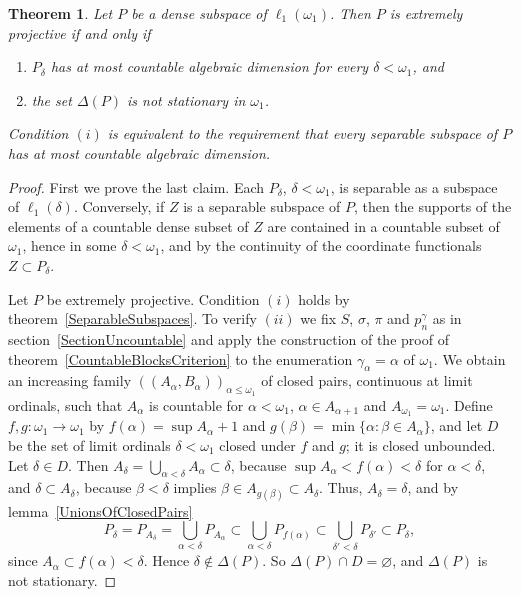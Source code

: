 \documentclass[12pt]{article}
\newtheorem{theorem}{Theorem}[section]
\newcommand{\ellone}[1]{\ell_1(#1)}
\begin{document}
\begin{theorem}\label{AlephOneCriterion} Let $P$ be a dense subspace of
    $\ellone{\omega_1}$. Then $P$ is extremely projective if and only if
    \begin{enumerate}[label = (\roman*)]
        \item $P_\delta$ has at most countable algebraic dimension for every
              $\delta<\omega_1$, and
        \item the set $\Delta(P)$ is not stationary in $\omega_1$.
    \end{enumerate}
    Condition $(i)$ is equivalent to the requirement that every separable
    subspace of $P$ has at most countable algebraic dimension.
\end{theorem}
\begin{proof} First we prove the last claim. Each $P_\delta$, $\delta<\omega_1$,
    is separable as a subspace of $\ellone{\delta}$. Conversely, if $Z$ is a
    separable subspace of $P$, then the supports of the elements of a
    countable dense subset of $Z$ are contained in a countable subset of
    $\omega_1$, hence in some $\delta<\omega_1$, and by the continuity of the
    coordinate functionals $Z\subset P_\delta$.

    Let $P$ be extremely projective. Condition $(i)$ holds by
    theorem~\ref{SeparableSubspaces}. To verify $(ii)$ we fix $S$, $\sigma$,
    $\pi$ and $p^\gamma_n$ as in section~\ref{SectionUncountable} and apply
    the construction of the proof of theorem~\ref{CountableBlocksCriterion}
    to the enumeration $\gamma_\alpha=\alpha$ of $\omega_1$. We obtain an
    increasing family ${((A_\alpha,B_\alpha))}_{\alpha\leq\omega_1}$ of closed
    pairs, continuous at limit ordinals, such that $A_\alpha$ is countable
    for $\alpha<\omega_1$, $\alpha\in A_{\alpha+1}$ and $A_{\omega_1}=\omega_1$.
    Define $f,g:\omega_1\to\omega_1$ by $f(\alpha)=\sup A_\alpha+1$ and
    $g(\beta)=\min\{\alpha:\beta\in A_\alpha\}$, and let $D$ be the set of
    limit ordinals $\delta<\omega_1$ closed under $f$ and $g$; it is closed
    unbounded. Let $\delta\in D$. Then
    $A_\delta=\bigcup_{\alpha<\delta}A_\alpha\subset\delta$, because
    $\sup A_\alpha<f(\alpha)<\delta$ for $\alpha<\delta$, and
    $\delta\subset A_\delta$, because $\beta<\delta$ implies
    $\beta\in A_{g(\beta)}\subset A_\delta$. Thus, $A_\delta=\delta$, and by
    lemma~\ref{UnionsOfClosedPairs}
    \[
    P_\delta=P_{A_\delta}=\bigcup_{\alpha<\delta}P_{A_\alpha}
    \subset\bigcup_{\alpha<\delta}P_{f(\alpha)}
    \subset\bigcup_{\delta'<\delta}P_{\delta'}\subset P_\delta,
    \]
    since $A_\alpha\subset f(\alpha)<\delta$. Hence $\delta\notin\Delta(P)$.
    So $\Delta(P)\cap D=\varnothing$, and $\Delta(P)$ is not stationary.


\end{proof}
\end{document}

